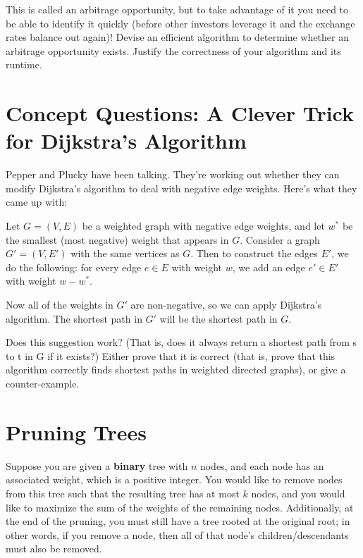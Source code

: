 \documentclass [12pt]{article}
\begin{document}
This is called an arbitrage opportunity, but to take advantage of it you need to be able to identify it quickly (before other investors leverage it and the exchange rates balance out again)! Devise an efficient algorithm to determine whether an arbitrage opportunity exists. Justify the correctness of your algorithm and its runtime.


\section{Concept Questions: A Clever Trick for Dijkstra's Algorithm }

Pepper and Plucky have been talking. They’re working out whether they can modify Dijkstra’s algorithm to deal with negative edge weights. Here’s what they came up with: 

Let $G = (V, E)$ be a weighted graph with negative edge weights, and let $w^*$ be the smallest (most negative) weight that appears in $G$. Consider a graph $G' = (V, E')$ with the same vertices as $G$. Then to construct the edges $E'$, we do the following: for every edge $e \in E$ with weight $w$, we add an edge $e' \in E'$ with weight $w - w^*$.

Now all of the weights in $G'$ are non-negative, so we can apply Dijkstra’s algorithm. The shortest path in $G'$ will be the shortest path in $G$.

Does this suggestion work? (That is, does it always return a shortest path from s to t in G if it exists?) Either prove that it is correct (that is, prove that this algorithm correctly finds shortest paths in weighted directed graphs), or give a counter-example.


\section {Pruning Trees }
\label{sec:last}

Suppose you are given a \textbf {binary} tree with $n$ nodes, and each node has an associated weight, which is a positive integer. You would like to remove nodes from this tree such that the resulting tree has at most $k$ nodes, and you would like to maximize the sum of the weights of the remaining nodes. Additionally, at the end of the pruning, you must still have a tree rooted at the original root; in other words, if you remove a node, then all of that node's children/descendants must also be removed. 
\end{document}
